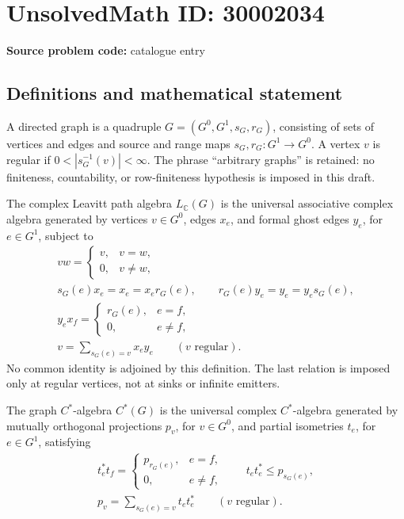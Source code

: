 \documentclass[11pt]{article}
\newcommand{\C}{\mathbb{C}}
\begin{document}
\section*{UnsolvedMath ID: 30002034}
\textbf{Source problem code:} catalogue entry
\subsection{Definitions and mathematical statement}
A directed graph is a quadruple \(G=(G^0,G^1,s_G,r_G)\), consisting of sets of vertices and edges and source and range maps \(s_G,r_G:G^1\to G^0\). A vertex \(v\) is regular if \(0<|s_G^{-1}(v)|<\infty\). The phrase ``arbitrary graphs'' is retained: no finiteness, countability, or row-finiteness hypothesis is imposed in this draft.

The complex Leavitt path algebra \(L_{\C}(G)\) is the universal associative complex algebra generated by vertices \(v\in G^0\), edges \(x_e\), and formal ghost edges \(y_e\), for \(e\in G^1\), subject to
\[
\begin{gathered}
 v w=\begin{cases}v,&v=w,\\0,&v\ne w,\end{cases}\\
 s_G(e)x_e=x_e=x_e r_G(e),\qquad
 r_G(e)y_e=y_e=y_e s_G(e),\\
 y_e x_f=\begin{cases}r_G(e),&e=f,\\0,&e\ne f,\end{cases}\\
 v=\sum_{s_G(e)=v}x_e y_e\qquad(v\text{ regular}).
\end{gathered}
\]
No common identity is adjoined by this definition. The last relation is imposed only at regular vertices, not at sinks or infinite emitters.

The graph \(C^*\)-algebra \(C^*(G)\) is the universal complex \(C^*\)-algebra generated by mutually orthogonal projections \(p_v\), for \(v\in G^0\), and partial isometries \(t_e\), for \(e\in G^1\), satisfying
\[
\begin{gathered}
 t_e^*t_f=\begin{cases}p_{r_G(e)},&e=f,\\0,&e\ne f,\end{cases}
 \qquad t_e t_e^*\le p_{s_G(e)},\\
 p_v=\sum_{s_G(e)=v}t_e t_e^*\qquad(v\text{ regular}).
\end{gathered}
\]
\end{document}

